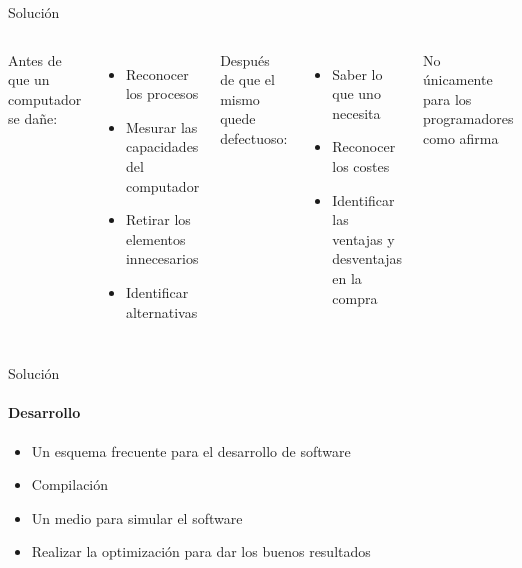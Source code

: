 \begin{frame}{Solución}
    \begin{columns}
        Antes de que un computador se dañe:
        \begin{itemize}
            \item Reconocer los procesos
            \item Mesurar las capacidades del computador
            \item Retirar los elementos innecesarios
            \item Identificar alternativas \parencite{free}
        \end{itemize} \pause
        Después de que el mismo quede defectuoso:
        \begin{itemize}
            \item Saber lo que uno necesita
            \item Reconocer los costes
            \item Identificar las ventajas y desventajas en la
            compra
        \end{itemize}
        No únicamente para los programadores como afirma \parencite{trejos}
    \end{columns}
\end{frame}
\begin{frame}{Solución}
    \framesubtitle{Desarrollo}
    \begin{itemize}
        \item Un esquema frecuente para el desarrollo de software 
        \parencite{devops}
        \item Compilación 
        \item Un medio para simular el software
        \item Realizar la optimización \textcite{rodriguez} para dar
        los buenos resultados
    \end{itemize}
\end{frame}

